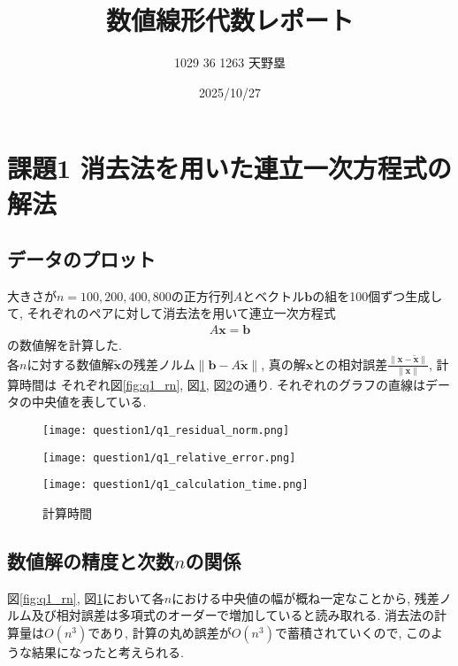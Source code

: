 \documentclass[uplatex,a4j]{jsarticle}
\title{数値線形代数レポート}
\author{1029 36 1263 天野塁}
\date{2025/10/27}
\begin{document}
\maketitle

\section{課題1 消去法を用いた連立一次方程式の解法}
\label{sec:q1}

\subsection{データのプロット}
\label{sec:q1_1}

大きさが$n = 100,200,400,800$の正方行列$A$とベクトル$\bm{b}$の組を100個ずつ生成して, 
それぞれのペアに対して消去法を用いて連立一次方程式
\begin{align}
  A \bm{x} = \bm{b}
\end{align}
の数値解を計算した. \\
各$n$に対する数値解$\bm{\tilde{x}}$の残差ノルム$\| \bm{b} - A \bm{\tilde{x}} \|$, 
真の解$\bm{x}$との相対誤差$\frac{\| \bm{x} - \bm{\tilde{x}} \|}{\| \bm{x} \|}$, 計算時間は
それぞれ図\ref{fig:q1_rn}, 図\ref{fig:q1_re}, 図\ref{fig:q1_ct}の通り. 
それぞれのグラフの直線はデータの中央値を表している.

\begin{figure}[htbp]
  \centering

  \begin{minipage}[t]{0.48\textwidth}
    \centering
    \texttt{[image: question1/q1\_residual\_norm.png]}
    \label{fig:q1_rn}
  \end{minipage}
  \hfill
  \begin{minipage}[t]{0.48\textwidth}
    \centering
    \texttt{[image: question1/q1\_relative\_error.png]}
    \label{fig:q1_re}
  \end{minipage}
  
\end{figure}

\begin{figure}[ht]
  \centering
  \texttt{[image: question1/q1\_calculation\_time.png]}
  \caption{計算時間}
  \label{fig:q1_ct}
\end{figure}

\newpage
\subsection{数値解の精度と次数$n$の関係}
\label{sec:q1_2}
図\ref{fig:q1_rn}, 図\ref{fig:q1_re}において各$n$における中央値の幅が概ね一定なことから, 
残差ノルム及び相対誤差は多項式のオーダーで増加していると読み取れる. 
消去法の計算量は$O(n^3)$であり, 計算の丸め誤差が$O(n^3)$で蓄積されていくので, このような結果になったと考えられる.
\end{document}
